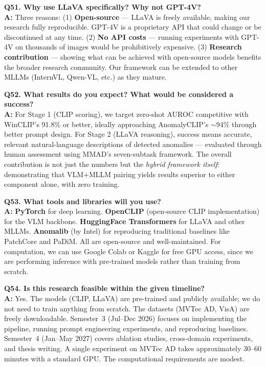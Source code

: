 \documentclass[12pt, a4paper]{article}
\begin{document}
\begin{qa}
\textbf{Q51. Why use LLaVA specifically? Why not GPT-4V?}\\[4pt]
\textbf{A:} Three reasons: (1) \textbf{Open-source} --- LLaVA is freely available, making our research fully reproducible. GPT-4V is a proprietary API that could change or be discontinued at any time. (2) \textbf{No API costs} --- running experiments with GPT-4V on thousands of images would be prohibitively expensive. (3) \textbf{Research contribution} --- showing what can be achieved with open-source models benefits the broader research community. Our framework can be extended to other MLLMs (InternVL, Qwen-VL, etc.) as they mature.
\end{qa}

\begin{qa}
\textbf{Q52. What results do you expect? What would be considered a success?}\\[4pt]
\textbf{A:} For Stage 1 (CLIP scoring), we target zero-shot AUROC competitive with WinCLIP's 91.8\% or better, ideally approaching AnomalyCLIP's $\sim$94\% through better prompt design. For Stage 2 (LLaVA reasoning), success means accurate, relevant natural-language descriptions of detected anomalies --- evaluated through human assessment using MMAD's seven-subtask framework. The overall contribution is not just the numbers but the \textit{hybrid framework itself}: demonstrating that VLM+MLLM pairing yields results superior to either component alone, with zero training.
\end{qa}

\begin{qa}
\textbf{Q53. What tools and libraries will you use?}\\[4pt]
\textbf{A:} \textbf{PyTorch} for deep learning. \textbf{OpenCLIP} (open-source CLIP implementation) for the VLM backbone. \textbf{HuggingFace Transformers} for LLaVA and other MLLMs. \textbf{Anomalib} (by Intel) for reproducing traditional baselines like PatchCore and PaDiM. All are open-source and well-maintained. For computation, we can use Google Colab or Kaggle for free GPU access, since we are performing inference with pre-trained models rather than training from scratch.
\end{qa}

\begin{qa}
\textbf{Q54. Is this research feasible within the given timeline?}\\[4pt]
\textbf{A:} Yes. The models (CLIP, LLaVA) are pre-trained and publicly available; we do not need to train anything from scratch. The datasets (MVTec AD, VisA) are freely downloadable. Semester~3 (Jul--Dec 2026) focuses on implementing the pipeline, running prompt engineering experiments, and reproducing baselines. Semester~4 (Jan--May 2027) covers ablation studies, cross-domain experiments, and thesis writing. A single experiment on MVTec AD takes approximately 30--60 minutes with a standard GPU. The computational requirements are modest.
\end{qa}
\end{document}
